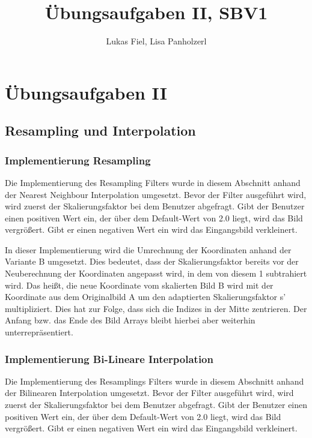 \documentclass[12pt,german]{article}
\begin{document}
\title{Übungsaufgaben II, SBV1 }
\author{Lukas Fiel, Lisa Panholzerl}
\maketitle


\newpage
\section{Übungsaufgaben II}
\subsection{Resampling und Interpolation}
\subsubsection{Implementierung Resampling}
Die Implementierung des Resampling Filters wurde in diesem Abschnitt anhand der Nearest Neighbour Interpolation umgesetzt. Bevor der Filter ausgeführt wird, wird zuerst der Skalierungsfaktor bei dem Benutzer abgefragt. Gibt der Benutzer einen positiven Wert ein, der über dem Default-Wert von 2.0 liegt, wird das Bild vergrößert. Gibt er einen negativen Wert ein wird das Eingangsbild verkleinert.

In dieser Implementierung wird die Umrechnung der Koordinaten anhand der Variante B umgesetzt. Dies bedeutet, dass der Skalierungsfaktor bereits vor der Neuberechnung der Koordinaten angepasst wird, in dem von diesem 1 subtrahiert wird. Das heißt, die neue Koordinate vom skalierten Bild B wird mit der Koordinate aus dem Originalbild A um den adaptierten Skalierungsfaktor s' multipliziert. Dies hat zur Folge, dass sich die Indizes in der Mitte zentrieren. Der Anfang bzw. das Ende des Bild Arrays bleibt hierbei aber weiterhin unterrepräsentiert.\\



\subsubsection{Implementierung Bi-Lineare Interpolation}
Die Implementierung des Resamplings Filters wurde in diesem Abschnitt anhand der Bilinearen Interpolation umgesetzt. Bevor der Filter ausgeführt wird, wird zuerst der Skalierungsfaktor bei dem Benutzer abgefragt. Gibt der Benutzer einen positiven Wert ein, der über dem Default-Wert von 2.0 liegt, wird das Bild vergrößert. Gibt er einen negativen Wert ein wird das Eingangsbild verkleinert.
\end{document}
